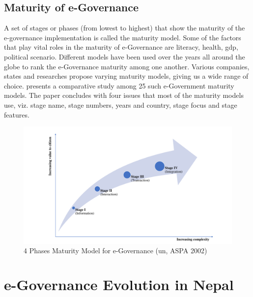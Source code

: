 \documentclass{home_assignment}
\newcommand\Myciteauthor[1]{\citeauthor{#1} \cite{#1}}
\begin{document}
    \subsection{Maturity of e-Governance}
    A set of stages or phases (from lowest to highest) that show the maturity of the e-governance implementation is called the maturity model. Some of the factors that play vital roles in the maturity of e-Governance are literacy, health, \acrfull{gdp}, political scenario. Different models have been used over the years all around the globe to rank the e-Governance maturity among one another. Various companies, states and researches propose varying maturity models, giving us a wide range of choice. \Myciteauthor{maturity} presents a comparative study among 25 such e-Government maturity models. The paper concludes with four issues that most of the maturity models use, viz. stage name, stage numbers, years and country, stage focus and stage features.
    \begin{figure}[H]
        \centering
        \includegraphics[width=0.9\linewidth]{../Figures/maturity.pdf}
        \caption{4 Phases Maturity Model for e-Governance (\acrshort{un}, ASPA 2002)}
        \label{fig:maturity}
    \end{figure}
    \section{e-Governance Evolution in Nepal}
\end{document}
